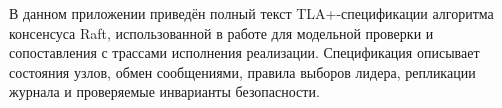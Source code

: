 
В данном приложении приведён полный текст TLA+-спецификации алгоритма консенсуса
Raft, использованной в работе для модельной проверки и сопоставления с трассами
исполнения реализации. Спецификация описывает состояния узлов, обмен
сообщениями, правила выборов лидера, репликации журнала и проверяемые
инварианты безопасности.

